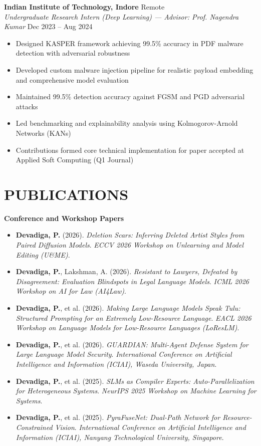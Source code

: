 \documentclass[a4paper,9pt]{extarticle}
\begin{document}
\noindent
\textbf{Indian Institute of Technology, Indore} \hfill Remote\\
\textit{Undergraduate Research Intern (Deep Learning) — Advisor: Prof. Nagendra Kumar} \hfill Dec 2023 -- Aug 2024
\begin{itemize}
    \item Designed KASPER framework achieving 99.5\% accuracy in PDF malware detection with adversarial robustness
    \item Developed custom malware injection pipeline for realistic payload embedding and comprehensive model evaluation
    \item Maintained 99.5\% detection accuracy against FGSM and PGD adversarial attacks
    \item Led benchmarking and explainability analysis using Kolmogorov-Arnold Networks (KANs)
    \item Contributions formed core technical implementation for paper accepted at Applied Soft Computing (Q1 Journal)
\end{itemize}

\section*{PUBLICATIONS}
\noindent
\textbf{Conference and Workshop Papers}
\begin{itemize}

\item \textbf{Devadiga, P.} (2026). \textit{Deletion Scars: Inferring Deleted Artist Styles from Paired Diffusion Models}. \textit{ECCV 2026 Workshop on Unlearning and Model Editing (U\&ME)}.

\item \textbf{Devadiga, P.}, Lakshman, A. (2026). \textit{Resistant to Lawyers, Defeated by Disagreement: Evaluation Blindspots in Legal Language Models}. \textit{ICML 2026 Workshop on AI for Law (AI4Law)}.

\item \textbf{Devadiga, P.}, et al. (2026). \textit{Making Large Language Models Speak Tulu: Structured Prompting for an Extremely Low-Resource Language}. \textit{EACL 2026 Workshop on Language Models for Low-Resource Languages (LoResLM)}.

\item \textbf{Devadiga, P.}, et al. (2026). \textit{GUARDIAN: Multi-Agent Defense System for Large Language Model Security}. \textit{International Conference on Artificial Intelligence and Information (ICIAI), Waseda University, Japan}.

\item \textbf{Devadiga, P.}, et al. (2025). \textit{SLMs as Compiler Experts: Auto-Parallelization for Heterogeneous Systems}. \textit{NeurIPS 2025 Workshop on Machine Learning for Systems}.

\item \textbf{Devadiga, P.}, et al. (2025). \textit{PyraFuseNet: Dual-Path Network for Resource-Constrained Vision}. \textit{International Conference on Artificial Intelligence and Information (ICIAI), Nanyang Technological University, Singapore}.

\end{itemize}
\end{document}

